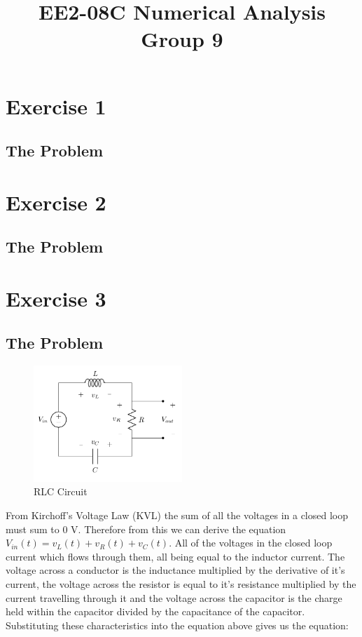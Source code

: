 \documentclass[11pt,a4paper]{article}
\date{}
\author{}
\begin{document}
\title{\textbf{EE2-08C Numerical Analysis} \\ Group 9\vspace{-17mm}}
\maketitle

\section*{Exercise 1}\vspace{-1mm}
\subsection*{The Problem}

\section*{Exercise 2}\vspace{-1mm}
\subsection*{The Problem}

\section*{Exercise 3}\vspace{-1mm}
\subsection*{The Problem}

\begin{figure}[h!]
  \includegraphics[width=0.5\textwidth]{Ex3_Figs/RLC.png}
  \caption{RLC Circuit}
  \label{fig:boat1}
\end{figure}
From Kirchoff's Voltage Law (KVL) the sum of all the voltages in a closed loop must sum to 0 V. Therefore from this we can derive the equation $V_{in}(t) = v_L(t)+v_R(t)+v_C(t)$. All of the voltages in the closed loop current which flows through them, all being equal to the inductor current. The voltage across a conductor is the inductance multiplied by the derivative of it's current, the voltage across the resistor is equal to it's resistance multiplied by the current travelling through it and the voltage across the capacitor is the charge held within the capacitor divided by the capacitance of the capacitor. Substituting these characteristics into the equation above gives us the equation:
\end{document}

